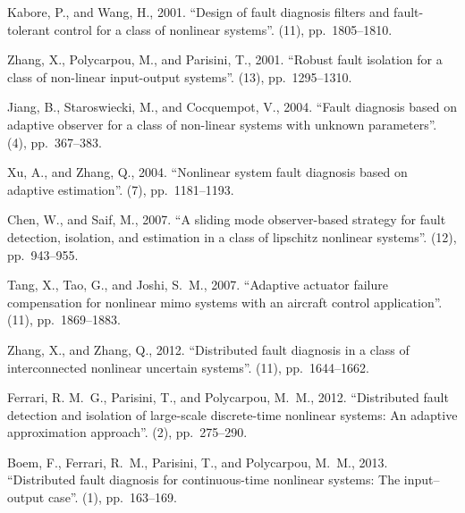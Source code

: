 \documentclass[10pt,twocolumn,twoside]{IEEEtran}
\begin{document}
\begin{thebibliography}{10}

Kabore, P., and Wang, H., 2001.
\newblock ``Design of fault diagnosis filters and fault-tolerant control for a
  class of nonlinear systems''.
(11),
  pp.~1805--1810.

Zhang, X., Polycarpou, M., and Parisini, T., 2001.
\newblock ``Robust fault isolation for a class of non-linear input-output
  systems''.
(13),
  pp.~1295--1310.

Jiang, B., Staroswiecki, M., and Cocquempot, V., 2004.
\newblock ``Fault diagnosis based on adaptive observer for a class of
  non-linear systems with unknown parameters''.
(4),
  pp.~367--383.

Xu, A., and Zhang, Q., 2004.
\newblock ``Nonlinear system fault diagnosis based on adaptive estimation''.
(7), pp.~1181--1193.

Chen, W., and Saif, M., 2007.
\newblock ``A sliding mode observer-based strategy for fault detection,
  isolation, and estimation in a class of lipschitz nonlinear systems''.
(12),
  pp.~943--955.

Tang, X., Tao, G., and Joshi, S.~M., 2007.
\newblock ``Adaptive actuator failure compensation for nonlinear mimo systems
  with an aircraft control application''.
(11), pp.~1869--1883.

Zhang, X., and Zhang, Q., 2012.
\newblock ``Distributed fault diagnosis in a class of interconnected nonlinear
  uncertain systems''.
(11),
  pp.~1644--1662.

Ferrari, R. M.~G., Parisini, T., and Polycarpou, M.~M., 2012.
\newblock ``Distributed fault detection and isolation of large-scale
  discrete-time nonlinear systems: An adaptive approximation approach''.
(2),
  pp.~275--290.

Boem, F., Ferrari, R.~M., Parisini, T., and Polycarpou, M.~M., 2013.
\newblock ``Distributed fault diagnosis for continuous-time nonlinear systems:
  The input--output case''.
(1), pp.~163--169.


\end{thebibliography}
\end{document}
